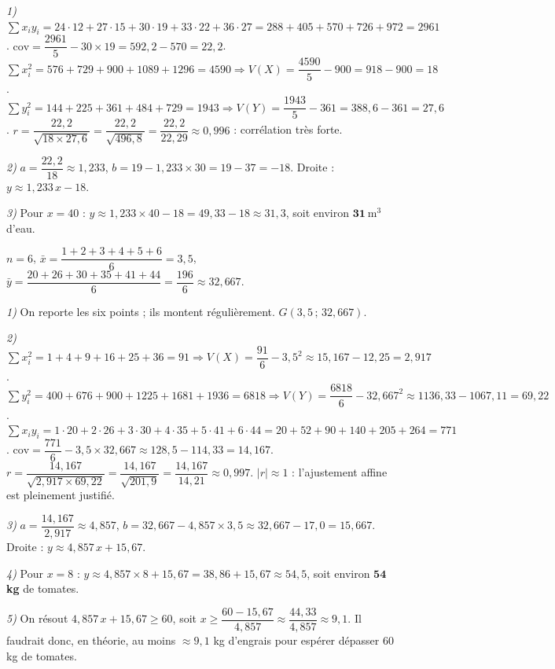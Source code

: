 \noindent\textit{1)} $\sum x_iy_i=24\!\cdot\!12+27\!\cdot\!15+30\!\cdot\!19+33\!\cdot\!22+36\!\cdot\!27
=288+405+570+726+972=2961$.
$\mathrm{cov}=\dfrac{2961}{5}-30\times19=592{,}2-570=22{,}2$.
$\sum x_i^2=576+729+900+1089+1296=4590\Rightarrow V(X)=\dfrac{4590}{5}-900=918-900=18$.
$\sum y_i^2=144+225+361+484+729=1943\Rightarrow V(Y)=\dfrac{1943}{5}-361=388{,}6-361=27{,}6$.
$r=\dfrac{22{,}2}{\sqrt{18\times27{,}6}}=\dfrac{22{,}2}{\sqrt{496{,}8}}=\dfrac{22{,}2}{22{,}29}\approx0{,}996$ : corrélation très forte.
\smallskip

\noindent\textit{2)} $a=\dfrac{22{,}2}{18}\approx1{,}233$, $b=19-1{,}233\times30=19-37=-18$.
Droite : $y\approx1{,}233\,x-18$.
\smallskip

\noindent\textit{3)} Pour $x=40$ : $y\approx1{,}233\times40-18=49{,}33-18\approx31{,}3$, soit
environ $\mathbf{31}\ \mathrm{m}^3$ d'eau.

$n=6$, $\bar x=\dfrac{1+2+3+4+5+6}{6}=3{,}5$,
$\bar y=\dfrac{20+26+30+35+41+44}{6}=\dfrac{196}{6}\approx32{,}667$.
\smallskip

\noindent\textit{1)} On reporte les six points ; ils montent régulièrement.
$G(3{,}5\,;\,32{,}667)$.
\smallskip

\noindent\textit{2)} $\sum x_i^2=1+4+9+16+25+36=91\Rightarrow V(X)=\dfrac{91}{6}-3{,}5^2
\approx15{,}167-12{,}25=2{,}917$.
$\sum y_i^2=400+676+900+1225+1681+1936=6818\Rightarrow V(Y)=\dfrac{6818}{6}-32{,}667^2
\approx1136{,}33-1067{,}11=69{,}22$.
$\sum x_iy_i=1\!\cdot\!20+2\!\cdot\!26+3\!\cdot\!30+4\!\cdot\!35+5\!\cdot\!41+6\!\cdot\!44
=20+52+90+140+205+264=771$.
$\mathrm{cov}=\dfrac{771}{6}-3{,}5\times32{,}667\approx128{,}5-114{,}33=14{,}167$.
$r=\dfrac{14{,}167}{\sqrt{2{,}917\times69{,}22}}=\dfrac{14{,}167}{\sqrt{201{,}9}}=\dfrac{14{,}167}{14{,}21}\approx0{,}997$.
$|r|\approx1$ : l'ajustement affine est pleinement justifié.
\smallskip

\noindent\textit{3)} $a=\dfrac{14{,}167}{2{,}917}\approx4{,}857$,
$b=32{,}667-4{,}857\times3{,}5\approx32{,}667-17{,}0=15{,}667$.
Droite : $y\approx4{,}857\,x+15{,}67$.
\smallskip

\noindent\textit{4)} Pour $x=8$ : $y\approx4{,}857\times8+15{,}67=38{,}86+15{,}67\approx54{,}5$, soit
environ $\mathbf{54}$ \textbf{kg} de tomates.
\smallskip

\noindent\textit{5)} On résout $4{,}857\,x+15{,}67\ge60$, soit $x\ge\dfrac{60-15{,}67}{4{,}857}
\approx\dfrac{44{,}33}{4{,}857}\approx9{,}1$. Il faudrait donc, en théorie, au moins
$\approx9{,}1$ kg d'engrais pour espérer dépasser $60$ kg de tomates.

